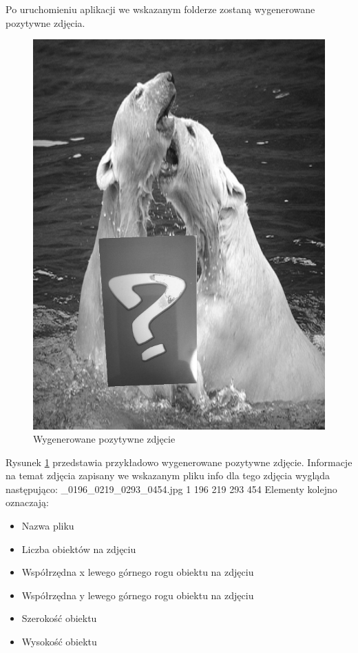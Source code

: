 Po uruchomieniu aplikacji we wskazanym folderze zostaną wygenerowane pozytywne zdjęcia.

\begin{figure}[H]
	\centering
	\includegraphics[scale=0.2]{imgs/0448_0134_0398_0203_0316.png}
	\caption{Wygenerowane pozytywne zdjęcie}\label{misie}
\end{figure}

Rysunek \ref{misie} przedstawia przykładowo wygenerowane pozytywne zdjęcie. Informacje na temat zdjęcia zapisany we wskazanym pliku info dla tego zdjęcia wygląda następująco: \_0196\_0219\_0293\_0454.jpg 1 196 219 293 454
Elementy kolejno oznaczają:

\begin{itemize}
	\item Nazwa pliku
	\item Liczba obiektów na zdjęciu
	\item Współrzędna x lewego górnego rogu obiektu na zdjęciu
	\item Współrzędna y lewego górnego rogu obiektu na zdjęciu
	\item Szerokość obiektu
	\item Wysokość obiektu
	
\end{itemize}

